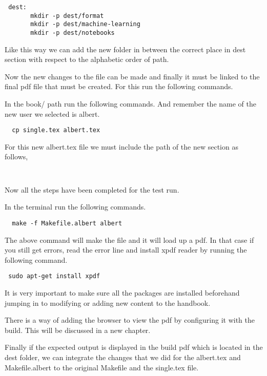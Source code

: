 \begin{lstlisting}
 dest:
       mkdir -p dest/format
       mkdir -p dest/machine-learning
       mkdir -p dest/notebooks
\end{lstlisting}

Like this way we can add the new folder in between the correct place
in dest section with respect to the alphabetic order of path.

Now the new changes to the file can be made and finally it must be
linked to the final pdf file that must be created. For this run the
following commands.

In the book/ path run the following commands. And remember the name
of the new user we selected is albert.

\begin{lstlisting}
  cp single.tex albert.tex
\end{lstlisting}

For this new albert.tex file we must include the path of the new
section as follows,

\begin{lstlisting}
 
\end{lstlisting}

Now all the steps have been completed for the test run.

In the terminal run the following commands.

\begin{lstlisting}
  make -f Makefile.albert albert
\end{lstlisting}

The above command will make the file and it will load up a pdf.  In
that case if you still get errors, read the error line and install
xpdf reader by running the following command.

\begin{lstlisting}
 sudo apt-get install xpdf
\end{lstlisting}

It is very important to make sure all the packages are installed
beforehand jumping in to modifying or adding new content to the
handbook.

There is a way of adding the browser to view the pdf by configuring it
with the build. This will be discussed in a new chapter.

Finally if the expected output is displayed in the build pdf which is located in the dest folder, we can integrate the changes that we did for the albert.tex and Makefile.albert to the original Makefile and the single.tex file. 

